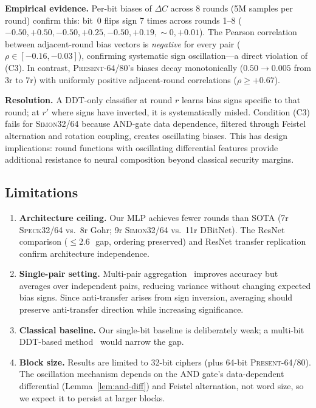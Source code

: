 \documentclass[runningheads]{llncs}
\newcommand{\speck}{\textsc{Speck32/64}\xspace}
\newcommand{\simon}{\textsc{Simon32/64}\xspace}
\newcommand{\present}{\textsc{Present-64/80}\xspace}
\newcommand{\pp}{\,\text{pp}}  %
\begin{document}
\textbf{Empirical evidence.}
Per-bit biases of $\Delta C$ across 8 rounds (5M samples per round) confirm this:
bit~0 flips sign 7 times across rounds 1--8 ($-0.50, +0.50, -0.50, +0.25, -0.50, +0.19, {\sim}0, +0.01$).
The Pearson correlation between adjacent-round bias vectors is \emph{negative} for every pair ($\rho \in [-0.16, -0.03]$), confirming systematic sign oscillation---a direct violation of (C3).
In contrast, \present's biases decay monotonically ($0.50 \to 0.005$ from 3r to 7r) with uniformly positive adjacent-round correlations ($\rho \geq +0.67$).

\textbf{Resolution.}
A DDT-only classifier at round $r$ learns bias signs specific to that round; at $r'$ where signs have inverted, it is systematically misled.
Condition (C3) fails for \simon because AND-gate data dependence, filtered through Feistel alternation and rotation coupling, creates oscillating biases.
This has design implications: round functions with oscillating differential features provide additional resistance to neural composition beyond classical security margins.

\subsection{Limitations}

\begin{enumerate}[leftmargin=*,itemsep=1pt]
  \item \textbf{Architecture ceiling.} Our MLP achieves fewer rounds than SOTA (7r \speck vs.\ 8r Gohr; 9r \simon vs.\ 11r DBitNet).
  The ResNet comparison ($\leq$2.6\pp\ gap, ordering preserved) and ResNet transfer replication confirm architecture independence.
  \item \textbf{Single-pair setting.} Multi-pair aggregation~\cite{zhang2025multipair} improves accuracy but averages over independent pairs, reducing variance without changing expected bias signs.
  Since anti-transfer arises from sign inversion, averaging should preserve anti-transfer direction while increasing significance.
  \item \textbf{Classical baseline.} Our single-bit baseline is deliberately weak; a multi-bit DDT-based method~\cite{gohr2022assessment} would narrow the gap.
  \item \textbf{Block size.} Results are limited to 32-bit ciphers (plus 64-bit \present).
  The oscillation mechanism depends on the AND gate's data-dependent differential (Lemma~\ref{lem:and-diff}) and Feistel alternation, not word size, so we expect it to persist at larger blocks.
\end{enumerate}
\end{document}
